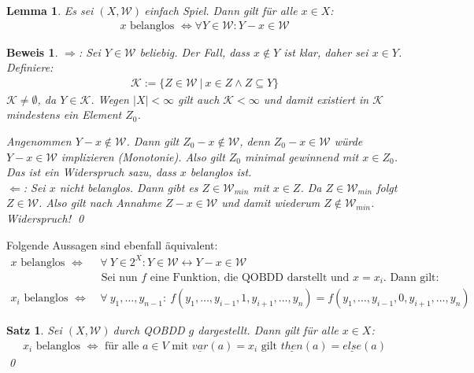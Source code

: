 \documentclass[ngerman]{scrartcl}
\theoremstyle{custom}
\newtheorem{ms}[mdef]{Satz}
\newtheorem{ml}[mdef]{Lemma}
\newtheorem*{bw}{Beweis}
\newcommand{\0}{\mathbf{0}}
\newcommand{\1}{\mathbf{L}}
\newcommand{\then}{\underline{then}}
\newcommand{\el}{\underline{else}}
\newcommand{\var}{\underline{var}}
\newcommand{\sg}{$(X,\mathcal{W})~$}
\newcommand{\W}{\mathcal{W}}
\begin{document}
\begin{ml}
Es sei \sg einfach Spiel. Dann gilt f\"ur alle $x \in X$:
\begin{align*}
x \text{ belanglos } \Leftrightarrow \forall Y \in \mathcal{W}: Y-x
\in \mathcal{W}
\end{align*}
\end{ml}

\begin{bw}
\glqq $\Rightarrow$\grqq: Sei $Y \in \W$ beliebig. Der Fall, dass $x
\not \in Y$ ist klar, daher sei $x \in Y$. Definiere:
\begin{align*}
\mathcal{K}:= \{ Z \in \W ~\vert~ x \in Z \wedge Z \subseteq Y \}
\end{align*}
$\mathcal{K} \not = \emptyset$, da $Y \in \mathcal{K}$. Wegen $\vert X
\vert < \infty$ gilt auch $\mathcal{K} < \infty$ und damit existiert
in $\mathcal{K}$ mindestens ein Element $Z_0$.

Angenommen $Y-x \not \in \W$. Dann gilt $Z_0-x \not \in \W$, denn
$Z_0-x \in \W$ w\"urde $Y-x \in \W$ implizieren (Monotonie). Also gilt
$Z_0$ minimal gewinnend mit $x \in Z_0$. Das ist ein Widerspruch sazu,
dass $x$ belanglos ist.\\
\glqq $\Leftarrow$\grqq: Sei $x$ nicht belanglos. Dann gibt es $Z \in
\W_{min}$ mit $x \in Z$. Da $Z \in \W_{min}$ folgt $Z \in \W$. Also
gilt nach Annahme $Z-x \in \W$ und damit wiederum $Z \not \in
\W_{min}$. Widerspruch!
\qed
\end{bw}

Folgende Aussagen sind ebenfall \"aquivalent:
\begin{align*}
x \text{ belanglos } \Leftrightarrow &~ \forall~ Y \in 2^X: Y \in \W
\leftrightarrow Y-x \in \W\\
&\text{ Sei nun } f \text{ eine Funktion, die QOBDD darstellt und }
x=x_i. \text{ Dann gilt: }\\
x_i \text{ belanglos } \Leftrightarrow &~ \forall~
y_1,\dots,y_{n-1}:~ f(y_1,\dots,y_{i-1},1,y_{i+1},\dots, y_n)=f(y_1,\dots,y_{i-1},0,y_{i+1},\dots,y_n)
\end{align*}

\begin{ms}
Sei \sg durch QOBDD $g$ dargestellt. Dann gilt f\"ur alle $x \in X$:
\begin{align*}
x_i \text{ belanglos } \Leftrightarrow \text{ f\"ur alle } a \in V
\text { mit } \var(a)=x_i \text{ gilt } \then(a) = \el(a)
\end{align*}
\qed
\end{ms}
\end{document}
